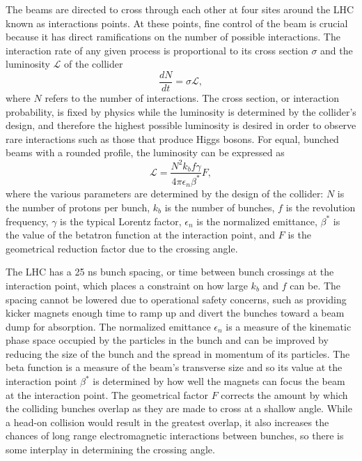 The beams are directed to cross through each other at four sites around the LHC known as interactions points. At these points, fine control of the beam is crucial because it has direct ramifications on the number of possible interactions. The interaction rate of any given process is proportional to its cross section $\sigma$ and the luminosity $\mathcal{L}$ of the collider
\begin{equation}
  \frac{dN}{dt} = \sigma\mathcal{L},
\end{equation}
where $N$ refers to the number of interactions. The cross section, or interaction probability, is fixed by physics while the luminosity is determined by the collider's design, and therefore the highest possible luminosity is desired in order to observe rare interactions such as those that produce Higgs bosons. For equal, bunched beams with a rounded profile, the luminosity can be expressed as
\begin{equation}
  \mathcal{L} = \frac{ N^{2} k_{b} f \gamma }{ 4 \pi \epsilon_{n} \beta^{\ast} } F,
\end{equation}
where the various parameters are determined by the design of the collider: $N$ is the number of protons per bunch, $k_{b}$ is the number of bunches, $f$ is the revolution frequency, $\gamma$ is the typical Lorentz factor, $\epsilon_{n}$ is the normalized emittance, $\beta^{\ast}$ is the value of the betatron function at the interaction point, and $F$ is the geometrical reduction factor due to the crossing angle.\cite{CMSTDR1}

The LHC has a 25 ns bunch spacing, or time between bunch crossings at the interaction point, which places a constraint on how large $k_{b}$ and $f$ can be. The spacing cannot be lowered due to operational safety concerns, such as providing kicker magnets enough time to ramp up and divert the bunches toward a beam dump for absorption. The normalized emittance $\epsilon_{n}$ is a measure of the kinematic phase space occupied by the particles in the bunch and can be improved by reducing the size of the bunch and the spread in momentum of its particles. The beta function is a measure of the beam's transverse size and so its value at the interaction point $\beta^{\ast}$ is determined by how well the magnets can focus the beam at the interaction point. The geometrical factor $F$ corrects the amount by which the colliding bunches overlap as they are made to cross at a shallow angle. While a head-on collision would result in the greatest overlap, it also increases the chances of long range electromagnetic interactions between bunches, so there is some interplay in determining the crossing angle.

